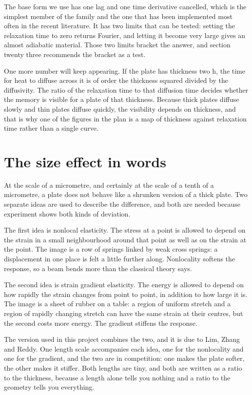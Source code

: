 \documentclass[11pt]{article}
\begin{document}
The base form we use has one lag and one time derivative cancelled, which is the simplest member of the
family and the one that has been implemented most often in the recent literature. It has two limits that can
be tested: setting the relaxation time to zero returns Fourier, and letting it become very large gives an
almost adiabatic material. Those two limits bracket the answer, and section twenty three recommends the
bracket as a test.

One more number will keep appearing. If the plate has thickness two h, the time for heat to diffuse across it
is of order the thickness squared divided by the diffusivity. The ratio of the relaxation time to that
diffusion time decides whether the memory is visible for a plate of that thickness. Because thick plates
diffuse slowly and thin plates diffuse quickly, the visibility depends on thickness, and that is why one of
the figures in the plan is a map of thickness against relaxation time rather than a single curve.

\section{The size effect in words}

At the scale of a micrometre, and certainly at the scale of a tenth of a micrometre, a plate does not behave
like a shrunken version of a thick plate. Two separate ideas are used to describe the difference, and both
are needed because experiment shows both kinds of deviation.

The first idea is nonlocal elasticity. The stress at a point is allowed to depend on the strain in a small
neighbourhood around that point as well as on the strain at the point. The image is a row of springs linked by
weak cross springs: a displacement in one place is felt a little further along. Nonlocality softens the
response, so a beam bends more than the classical theory says.

The second idea is strain gradient elasticity. The energy is allowed to depend on how rapidly the strain
changes from point to point, in addition to how large it is. The image is a sheet of rubber on a table: a
region of uniform stretch and a region of rapidly changing stretch can have the same strain at their centres,
but the second costs more energy. The gradient stiffens the response.

The version used in this project combines the two, and it is due to Lim, Zhang and Reddy. One length scale
accompanies each idea, one for the nonlocality and one for the gradient, and the two are in competition: one
makes the plate softer, the other makes it stiffer. Both lengths are tiny, and both are written as a ratio to
the thickness, because a length alone tells you nothing and a ratio to the geometry tells you everything.
\end{document}
